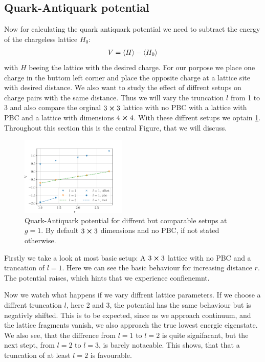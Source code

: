 \subsection{Quark-Antiquark potential}
Now for calculating the quark antiquark potential we need to subtract the energy of the chargeless lattice $H_{0}$:
\begin{align}
	V = \Braket{H} - \Braket{H_{0}}
\end{align}
with $H$ beeing the lattice with the desired charge. For our porpose we place one charge in the buttom left corner and place the opposite charge at a lattice site with desired distance. We also want to study the effect of diffrent setups on charge pairs with the same distance. Thus we will vary the truncation $l$ from 1 to 3 and also compare the orginal $3 \cross 3$ lattice with no PBC with a lattice with PBC and a lattice with dimensions $4\cross 4$. With these diffrent setups we optain \cref{fig:qqbar}. Throughout this section this is the central Figure, that we will discuss.
\begin{figure}[h]
	\begin{center}
		\includegraphics[width=0.45\textwidth]{images/quark_antiquark_potential_normal_g.pdf}
	\end{center}
  \caption{Quark-Antiquark potential for diffrent but comparable setups at $g=\num{1}$. By default $3\cross3$ dimensions and no PBC, if not stated otherwise.}\label{fig:qqbar}
\end{figure}
Firstly we take a look at most basic setup: A $3\cross 3$ lattice with no PBC and a trancation of $l=1$. Here we can see the basic behaviour for increasing distance $r$. The potential raises, which hints that we experience confienemnt. %

Now we watch what happens if we vary diffrent lattice parameters. If we choose a diffrent truncation $l$, here 2 and 3, the potential has the same behaviour but is negativly shifted. This is to be expected, since as we approach continuum, and the lattice fragments vanish, we also approach the true lowest energie eigenstate. We also see, that the diffrence from $l=1$ to $l=2$ is quite signifacant, but the next stept, from $l=2$ to $l=3$, is barely notacable. This shows, that that a truncation of at least $l=2$ is favourable.

